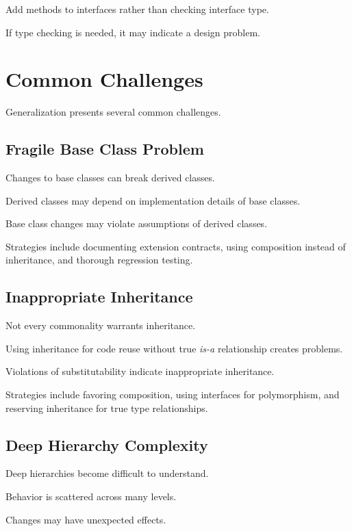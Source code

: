 \documentclass[11pt]{article}
\begin{document}
Add methods to interfaces rather than checking interface type.

If type checking is needed, it may indicate a design problem.

\section{Common Challenges}

Generalization presents several common challenges.

\subsection{Fragile Base Class Problem}

Changes to base classes can break derived classes.

Derived classes may depend on implementation details of base classes.

Base class changes may violate assumptions of derived classes.

Strategies include documenting extension contracts, using composition instead of inheritance, and thorough regression testing.

\subsection{Inappropriate Inheritance}

Not every commonality warrants inheritance.

Using inheritance for code reuse without true \emph{is-a} relationship creates problems.

Violations of substitutability indicate inappropriate inheritance.

Strategies include favoring composition, using interfaces for polymorphism, and reserving inheritance for true type relationships.

\subsection{Deep Hierarchy Complexity}

Deep hierarchies become difficult to understand.

Behavior is scattered across many levels.

Changes may have unexpected effects.
\end{document}
